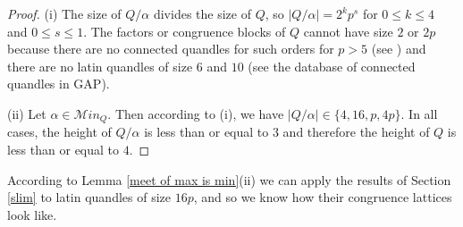 \documentclass[a4paper, english, 9pt]{amsart}
\theoremstyle{plain}
\theoremstyle{definition}
\def\con{\mathrm{Con}}
\def\comment#1{{\color{red} #1}}
\def\Ma{\mathcal Max}
\def\ma{\mathcal Min}
\begin{document}
\begin{proof}
(i) The size of $Q/\alpha$ divides the size of $Q$, so $|Q/\alpha|=2^k p^s$ for $0\leq k\leq 4$ and $0\leq s\leq 1$. The factors or congruence blocks of $Q$ cannot have size $2$ or $2p$ because there are no connected quandles for such orders for $p>5$ (see \cite{McCarron}) and there are no latin quandles of size $6$ and $10$ (see the database of connected quandles \cite{RIG} in GAP). 

(ii) Let $\alpha\in \ma_Q$. Then according to (i), we have $|Q/\alpha|\in \{4,16,p,4p\}$. In all cases, the height of $Q/\alpha$ is less than or equal to $3$ and therefore the height of $Q$ is less than or equal to $4$. 
%
%
%
%
%
%
\end{proof}
According to Lemma \ref{meet of max is min}(ii) we can apply the results of Section \ref{slim} to latin quandles of size $16p$, and so we know how their congruence lattices look like.
\end{document}
